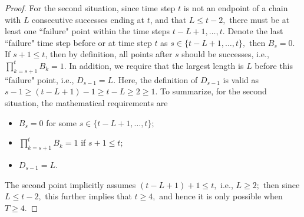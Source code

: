 \documentclass{article}
\theoremstyle{plain}
\theoremstyle{definition}
\theoremstyle{remark}
\begin{document}
\begin{proof}
For the second situation, since time step $t$ is not an endpoint of a chain with $L$ consecutive successes ending at $t$, and that $L\leq t-2,$ there must be at least one ``failure" point within the time steps $t-L+1, \dots, t.$ Denote the last ``failure" time step before or at time step $t$ as $s\in\{t-L+1, \dots, t\},$ then $B_s=0.$ If $s+1\leq t$, then by definition, all points after $s$ should be successes, i.e., $\prod_{k=s+1}^tB_k=1$. In addition, we require that the largest length is $L$ before this ``failure" point, i.e., $D_{s-1}=L$. Here, the definition of $D_{s-1}$ is valid as $s-1\geq (t-L+1)-1\geq t-L\geq 2\geq 1.$ To summarize, for the second situation, the mathematical requirements are 
\begin{itemize}
    \item $B_s=0$ for some $s\in\{t-L+1, \dots, t\};$
    \item $\prod_{k=s+1}^tB_k=1$ if $s+1\leq t;$ 
    \item $D_{s-1}=L$.
\end{itemize}

The second point implicitly assumes $(t-L+1)+1\leq t,$ i.e., $L\geq 2;$ then since $L\leq t-2,$ this further implies that $t\geq 4,$ and hence it is only possible when $T\geq 4.$


\end{proof}
\end{document}
